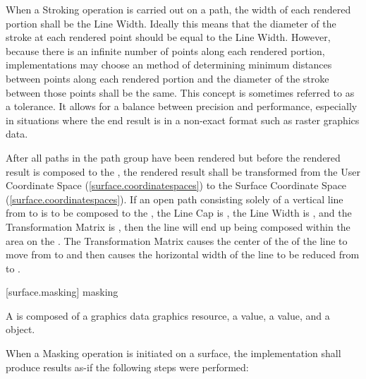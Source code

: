 \pnum
When a Stroking operation is carried out on a path, the width of each rendered portion shall be the Line Width. Ideally this means that the diameter of the stroke at each rendered point should be equal to the Line Width. However, because there is an infinite number of points along each rendered portion, implementations may choose an \unspecnorm method of determining minimum distances between points along each rendered portion and the diameter of the stroke between those points shall be the same.
\enternote
This concept is sometimes referred to as a tolerance. It allows for a balance between precision and performance, especially in situations where the end result is in a non-exact format such as raster graphics data.
\exitnote

\pnum
After all paths in the path group have been rendered but before the rendered result is composed to the \underlyingsurface, the rendered result shall be transformed from the User Coordinate Space (\ref{surface.coordinatespaces}) to the Surface Coordinate Space (\ref{surface.coordinatespaces}).
\enterexample
If an open path consisting solely of a vertical line from  to  is to be composed to the \underlyingsurface, the Line Cap is , the Line Width is , and the Transformation Matrix is , then the line will end up being composed within the area  on the \underlyingsurface. The Transformation Matrix causes the center of the \xaxis of the line to move from  to  and then causes the horizontal width of the line to be reduced from  to .
\exitexample

 [surface.masking] { masking}

\pnum
A  is composed of a graphics data graphics resource, a  value, a  value, and a  object.

\pnum
When a Masking operation is initiated on a surface, the implementation shall produce results as-if the following steps were performed:

